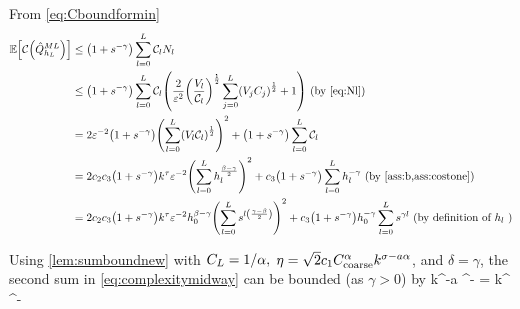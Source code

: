 From \cref{eq:Cboundformin}
\begin{align}
\EXP{\Cost{\QhatMLhL}} &\leq \mleft(1+s^{-\gamma}\mright)\sum_{l=0}^{L} \Cl \Nl\nonumber\\
&\leq \mleft(1+s^{-\gamma}\mright)\sum_{l=0}^L \Cl \mleft(\frac2{\eps^{2}} \mleft(\frac{\Vl}{\Cl}\mright)^{\half}\sum_{j=0}^L \mleft(\Vj\Cj\mright)^{\half} + 1\mright) \text{ (by \eqref{eq:Nl})}\nonumber\\
&= 2\eps^{-2}\mleft(1+s^{-\gamma}\mright)\mleft(\sum_{l=0}^L\mleft(\Vl\Cl\mright)^{\half}\mright)^2 + \mleft(1+s^{-\gamma}\mright)\sum_{l=0}^L \Cl\nonumber\\
&= 2 \ct \cth \mleft(1+s^{-\gamma}\mright)k^{\tau}\eps^{-2} \mleft(\sum_{l=0}^L \hl^{\frac{\beta-\gamma}2}\mright)^2 + \cth \mleft(1+s^{-\gamma}\mright) \sum_{l=0}^L \hl^{-\gamma} \text{ (by \cref{ass:b,ass:costone})}\nonumber\\
&= 2 \ct\cth \mleft(1+s^{-\gamma}\mright)k^{\tau}\eps^{-2}\hz^{\beta-\gamma}\mleft(\sum_{l=0}^L s^{l\mleft(\frac{\gamma-\beta}2\mright)}\mright)^2 + \cth\mleft(1+s^{-\gamma}\mright) \hz^{-\gamma} \sum_{l=0}^L s^{\gamma l} \text{ (by definition of } \hl\text{ )}\label{eq:complexitymidway}\\
\end{align}

Using \cref{lem:sumboundnew} with $C_{L} = 1/\alpha,$ $\eta = \sqrt{2}c_{1}C_{\mathrm{coarse}}^\alpha k^{\sigma - a\alpha}$, and $\delta = \gamma$, the second sum in \eqref{eq:complexitymidway} can be bounded (as $\gamma > 0$) by %
\beq\label{eq:firstterm}
\cth{} k^{\frac{\gamma\sigma}\alpha-a\gamma} \eps^{-\frac\gamma\alpha}
=  k^{\frac{\gamma\sigma}\alpha} \eps^{-\frac\gamma\alpha}
\eeq

